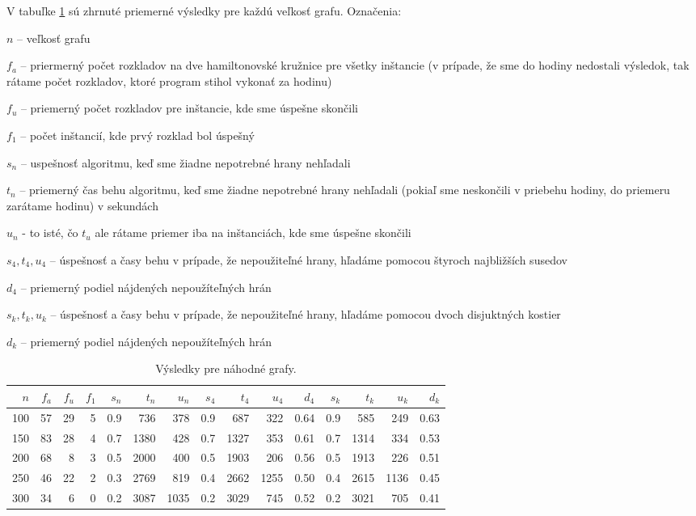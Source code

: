 V tabuľke \ref{table1} sú zhrnuté priemerné výsledky pre každú veľkosť grafu.
Označenia: 
\begin{myitemize}
\item $n$ -- veľkosť grafu
\item $f_a$ -- priermerný počet rozkladov na dve hamiltonovské kružnice pre všetky
inštancie (v prípade, že sme do hodiny nedostali výsledok, tak rátame počet rozkladov, ktoré program
stihol vykonať za hodinu)
\item $f_u$ -- priemerný počet rozkladov pre inštancie, kde sme úspešne skončili
\item $f_1$ -- počet inštancií, kde prvý rozklad bol úspešný 
\item $s_n$ -- uspešnosť algoritmu, keď sme žiadne nepotrebné hrany nehľadali
\item $t_n$ -- priemerný čas behu algoritmu, keď sme žiadne nepotrebné hrany nehľadali (pokiaľ sme
neskončili v priebehu hodiny, do priemeru zarátame hodinu) v sekundách
\item $u_n$ - to isté, čo $t_u$ ale rátame priemer iba na inštanciách, kde sme úspešne skončili
\item $s_4, t_4, u_4$ -- úspešnosť a časy behu v prípade, že nepoužiteľné hrany, hľadáme pomocou
štyroch najbližších susedov
\item $d_4$ -- priemerný podiel nájdených nepoužíteľných hrán
\item $s_k, t_k, u_k$ -- úspešnosť a časy behu v prípade, že nepoužiteľné hrany, hľadáme pomocou
dvoch disjuktných kostier
\item $d_k$ -- priemerný podiel nájdených nepoužíteľných hrán
\end{myitemize}



\begin{table}[h]
\centering
\begin{tabular}{|r|r|r|r|r|r|r|r|r|r|r|r|r|r|r|}
\hline
$n$&$f_a$&$f_u$&$f_1$&$s_n$&$t_n$&$u_n$&$s_4$&$t_4$&$u_4$&$d_4$&$s_k$&$t_k$&$u_k$&$d_k$ \\\hline
100& 57  & 29  & 5   & 0.9 & 736 & 378 & 0.9 & 687 & 322 & 0.64& 0.9 & 585 & 249 & 0.63 \\\hline
150& 83  & 28  & 4   & 0.7 & 1380& 428 & 0.7 & 1327& 353 & 0.61& 0.7 & 1314& 334 & 0.53 \\\hline
200& 68  & 8   & 3   & 0.5 & 2000& 400 & 0.5 & 1903& 206 & 0.56& 0.5 & 1913& 226 & 0.51 \\\hline
250& 46  & 22  & 2   & 0.3 & 2769& 819 & 0.4 & 2662& 1255& 0.50& 0.4 & 2615& 1136& 0.45 \\\hline
300& 34  & 6   & 0   & 0.2 & 3087& 1035& 0.2 & 3029& 745 & 0.52& 0.2 & 3021& 705 & 0.41 \\\hline
\end{tabular}
\caption{Výsledky pre náhodné grafy.}
\label{table1}
\end{table}


